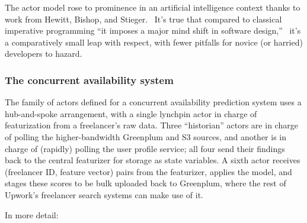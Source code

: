 \documentclass{article}
\begin{document}
The actor model rose to prominence in an artificial intelligence context thanks to
work from Hewitt, Bishop, and Stieger.~\cite{hewitt1973ijcai} It's true that compared
to classical imperative programming ``it imposes a major mind shift in software
design,''~\cite{korland2011thesis} it's a comparatively small leap with respect, with
fewer pitfalls for novice (or harried) developers to hazard.

\subsubsection{The concurrent availability system}


The family of actors defined for a concurrent availability prediction system uses a
hub-and-spoke arrangement, with a single lynchpin actor in charge of featurization
from a freelancer's raw data. Three ``historian'' actors are in charge of polling the 
higher-bandwidth Greenplum and S3 sources, and another is in charge of (rapidly)
polling the user profile service; all four send their findings back to the central
featurizer for storage as state variables. A sixth actor receives (freelancer ID, feature
vector) pairs from the featurizer, applies the model, and stages these scores to be
bulk uploaded back to Greenplum, where the rest of Upwork's freelancer search
systems can make use of it.

In more detail:
\end{document}
